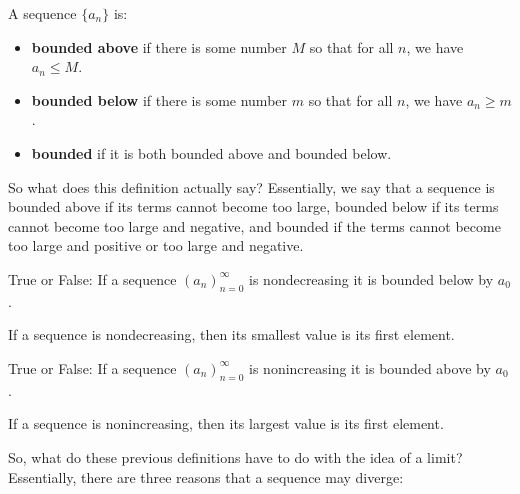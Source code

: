 \documentclass{ximera}
\begin{document}
\begin{definition}
  \label{definition:sequence-bounded}
  A sequence $\{a_n\}$ is:
  
  \begin{itemize}
  \item \textbf{bounded above} if there is some number $M$ so
  that for all $n$, we have $a_n\le M$.
    \item \textbf{bounded below} if there is some number $m$ so
  that for all $n$, we have $a_n\ge m$.
  \item \textbf{bounded} if it is both bounded above and bounded below.
  \end{itemize}
\end{definition}

So what does this definition actually say? Essentially, we say that a sequence is bounded above if its terms cannot become too large, bounded below if its terms cannot become too large and negative, and bounded if the terms cannot become too large and positive or too large and negative.

\begin{question}
  True or False: If a sequence $(a_n)_{n=0}^\infty$ is nondecreasing
  it is bounded below by $a_0$.
  \begin{prompt}
    \begin{multipleChoice}
    \end{multipleChoice}
  \end{prompt}
  \begin{feedback}
    If a sequence is nondecreasing, then its smallest value is its
    first element.
  \end{feedback}
\end{question}


\begin{question}
  True or False: If a sequence $(a_n)_{n=0}^\infty$ is nonincreasing
  it is bounded above by $a_0$.
  \begin{prompt}
    \begin{multipleChoice}
    \end{multipleChoice}
  \end{prompt}
  \begin{feedback}
    If a sequence is nonincreasing, then its largest value is its
    first element.
  \end{feedback}
\end{question}

So, what do these previous definitions have to do with the idea of a limit?  Essentially, there are three reasons that a sequence may diverge:
\end{document}

